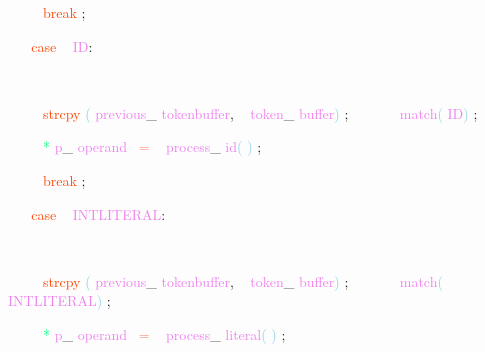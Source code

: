 \documentclass[8, usernames, dvipsnames]{beamer}
\begin{document}
\begin{frame}
\textcolor{White}{\   }
\textcolor{White}{\   }
\textcolor{White}{\   }
\textcolor{OrangeRed}{break}
\textcolor{Sepia}{;}

 \textcolor{White}{\   }
\textcolor{White}{\   }
\textcolor{OrangeRed}{case}
\textcolor{White}{\ }
\textcolor{Violet}{ID}\textcolor{Sepia}{:}

 \textcolor{White}{\   }
\textcolor{White}{\   }
\textcolor{White}{\   }

 \textcolor{White}{\   }
\textcolor{White}{\   }
\textcolor{White}{\   }
\textcolor{OrangeRed}{strcpy}
\textcolor{SkyBlue}{(}
\textcolor{Violet}{previous}\textcolor{Sepia}{\_}
\textcolor{Violet}{tokenbuffer}\textcolor{Sepia}{,}
\textcolor{White}{\ }
\textcolor{Violet}{token}\textcolor{Sepia}{\_}
\textcolor{Violet}{buffer}\textcolor{SkyBlue}{)}
\textcolor{Sepia}{;}
\textcolor{White}{\ }
\textcolor{White}{\   }
\textcolor{White}{\   }
\textcolor{White}{\   }
\textcolor{Violet}{match}\textcolor{SkyBlue}{(}
\textcolor{Violet}{ID}\textcolor{SkyBlue}{)}
\textcolor{Sepia}{;}

 \textcolor{White}{\   }
\textcolor{White}{\   }
\textcolor{White}{\   }
\textcolor{SpringGreen}{*}
\textcolor{Violet}{p}\textcolor{Sepia}{\_}
\textcolor{Violet}{operand}\textcolor{White}{\ }
\textcolor{Salmon}{=}
\textcolor{White}{\ }
\textcolor{Violet}{process}\textcolor{Sepia}{\_}
\textcolor{Violet}{id}\textcolor{SkyBlue}{(}
\textcolor{SkyBlue}{)}
\textcolor{Sepia}{;}

 \textcolor{White}{\   }
\textcolor{White}{\   }
\textcolor{White}{\   }
\textcolor{OrangeRed}{break}
\textcolor{Sepia}{;}

 \textcolor{White}{\   }
\textcolor{White}{\   }
\textcolor{OrangeRed}{case}
\textcolor{White}{\ }
\textcolor{Violet}{INTLITERAL}\textcolor{Sepia}{:}

 \textcolor{White}{\   }
\textcolor{White}{\   }
\textcolor{White}{\   }

 \textcolor{White}{\   }
\textcolor{White}{\   }
\textcolor{White}{\   }
\textcolor{OrangeRed}{strcpy}
\textcolor{SkyBlue}{(}
\textcolor{Violet}{previous}\textcolor{Sepia}{\_}
\textcolor{Violet}{tokenbuffer}\textcolor{Sepia}{,}
\textcolor{White}{\ }
\textcolor{Violet}{token}\textcolor{Sepia}{\_}
\textcolor{Violet}{buffer}\textcolor{SkyBlue}{)}
\textcolor{Sepia}{;}
\textcolor{White}{\ }
\textcolor{White}{\   }
\textcolor{White}{\   }
\textcolor{White}{\   }
\textcolor{Violet}{match}\textcolor{SkyBlue}{(}
\textcolor{Violet}{INTLITERAL}\textcolor{SkyBlue}{)}
\textcolor{Sepia}{;}

 \textcolor{White}{\   }
\textcolor{White}{\   }
\textcolor{White}{\   }
\textcolor{SpringGreen}{*}
\textcolor{Violet}{p}\textcolor{Sepia}{\_}
\textcolor{Violet}{operand}\textcolor{White}{\ }
\textcolor{Salmon}{=}
\textcolor{White}{\ }
\textcolor{Violet}{process}\textcolor{Sepia}{\_}
\textcolor{Violet}{literal}\textcolor{SkyBlue}{(}
\textcolor{SkyBlue}{)}
\textcolor{Sepia}{;}

 \end{frame}
\end{document}
